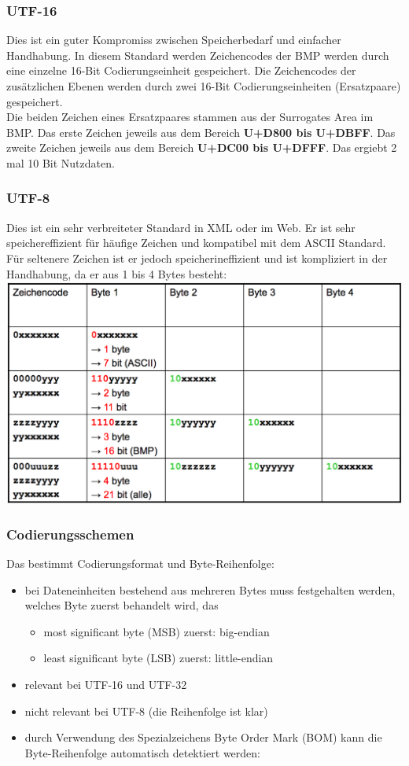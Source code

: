\documentclass[a4paper,10pt]{article}
\newcommand{\Bold}[1]{\textbf{#1}} %
\begin{document}
\subsubsection{UTF-16}
Dies ist ein guter Kompromiss zwischen Speicherbedarf und einfacher Handhabung. In diesem Standard werden Zeichencodes der BMP werden durch eine einzelne 16-Bit Codierungseinheit gespeichert. Die Zeichencodes der zus\"atzlichen Ebenen werden durch zwei 16-Bit Codierungseinheiten (Ersatzpaare) gespeichert. \\
Die beiden Zeichen eines Ersatzpaares stammen aus der Surrogates Area im BMP. Das erste Zeichen jeweils aus dem Bereich \Bold {U+D800 bis U+DBFF}. Das zweite Zeichen jeweils aus dem Bereich \Bold {U+DC00 bis U+DFFF}. Das ergiebt 2 mal 10 Bit Nutzdaten.

\subsubsection{UTF-8}
Dies ist ein sehr verbreiteter Standard in XML oder im Web. Er ist sehr speichereffizient f\"ur h\"aufige Zeichen und kompatibel mit dem ASCII Standard. F\"ur seltenere Zeichen ist er jedoch speicherineffizient und ist kompliziert in der Handhabung, da er aus 1 bis 4 Bytes besteht: \\
\includegraphics[scale=0.35]{utf8.png}

\subsubsection{Codierungsschemen}
Das bestimmt Codierungsformat und Byte-Reihenfolge:
\begin{itemize}
	\item bei Dateneinheiten bestehend aus mehreren Bytes muss festgehalten werden, welches Byte zuerst behandelt wird, das
		\begin{itemize}
			\item most significant byte (MSB) zuerst: big-endian
			\item least significant byte (LSB) zuerst: little-endian
 		\end{itemize}		 
 	\item relevant bei UTF-16 und UTF-32
 	\item nicht relevant bei UTF-8 (die Reihenfolge ist klar)
 	\item durch Verwendung des Spezialzeichens Byte Order Mark (BOM) kann die Byte-Reihenfolge automatisch detektiert werden:
\end{itemize}
\newpage
\end{document}
